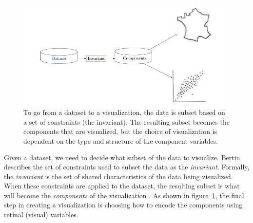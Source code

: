 \documentclass[../main.tex]{subfiles}
\begin{document}
\begin{figure}[h!]
\includegraphics[width=\textwidth]{figures/intro/flowchart.png} 
\caption{To go from a dataset to a visualization, the data is subset based on a set of constraints (the invariant). The resulting subset becomes the components that are visualized, but the choice of visualization is dependent on the type and structure of the component variables.}
\label{fig:flowchart}
\end{figure}

Given a dataset, we need to decide what subset of the data to visualize. Bertin describes the set of constraints used to subset the data as the \textit{invariant}. Formally, the \textit{invariant} is the set of shared characteristics of the data being visualized. When these constraints are applied to the dataset, the resulting subset is what will become the \textit{components} of the visualization \cite{bertinSemiologyGraphicsDiagrams2011a}. 
As shown in figure~\ref{fig:flowchart}, the final step in creating a visualization is choosing how to encode the
components using retinal (visual) variables.
 
\end{document}
